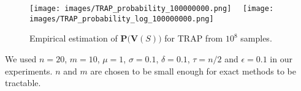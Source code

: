 \documentclass[runningheads]{llncs}
\begin{document}
	\begin{figure}[h]
		\centering
		\texttt{[image: images/TRAP\_probability\_100000000.png]}~\hspace{1.0em}~
		\texttt{[image: images/TRAP\_probability\_log\_100000000.png]}
		\caption{Empirical estimation of $\bm{P}\big(\bm{V}(S)\big)$ for TRAP from $10^8$ samples.}
		\label{fig:empirical-distribution-trap}
	\end{figure}

	We used  $n=20$, $m=10$, $\mu = 1$, $\sigma = 0.1$, $\delta = 0.1$, $\tau = n/2$ and $\epsilon = 0.1$ in our experiments. $n$ and $m$ are chosen to be small enough for exact methods to be tractable.  
	
	
	
\end{document}
